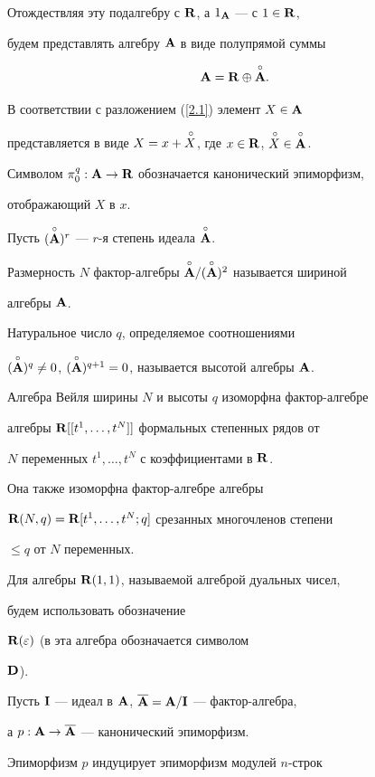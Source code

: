 Отождествляя эту подалгебру с ${\bold R}$, а $1_{\bold A}$ --- с $1\in{\bold R}$,


будем представлять алгебру ${\bold A}$ в виде полупрямой суммы


\begin{equation}


\A=\R\oplus{\Ao}.


\label{2.1}


\end{equation}


В соответствии с разложением (\ref{2.1}) элемент $X\in{\bold A}$


представляется в виде $X=x+{\overset{\,\circ}{X}{}}$, где $x\in{\bold R}$, $\overset{\,\circ}{X}{}\in\overset{\circ}{\bold A}{}$.


Символом ${\pi^q_0}:{\bold A}\to{\bold R}$ обозначается канонический эпиморфизм,


отображающий $X$ в $x$.


Пусть $(\overset{\circ}{\bold A}{})^r$ --- $r$-я степень идеала $\overset{\circ}{\bold A}{}$.


Размерность $N$ фактор-алгебры ${\overset{\circ}{\bold A}{}}/({\overset{\circ}{\bold A}{}})^2$ называется шириной


алгебры ${\bold A}$.


Натуральное число $q$, определяемое соотношениями


$(\overset{\circ}{\bold A}{})^q\ne 0$, $(\overset{\circ}{\bold A}{})^{q+1}=0$, называется высотой алгебры ${\bold A}$.


Алгебра Вейля ширины $N$ и высоты $q$ изоморфна фактор-алгебре


алгебры ${\bold R}[[t^1,\dotsc,t^N]]$ формальных степенных рядов от


$N$ переменных $t^1,\dotsc,t^N$ с коэффициентами в ${\bold R}$.


Она также изоморфна фактор-алгебре алгебры


${\bold R}(N,q)={\bold R}[t^1,\dotsc,t^N;q]$ срезанных многочленов степени


$\le q$ от $N$ переменных.


Для алгебры ${\bold R}(1,1)$, называемой алгеброй дуальных чисел,


будем использовать обозначение


${\bold R}(\varepsilon)$ (в \cite{KMS} эта алгебра обозначается символом


$\bold D$).


 


Пусть ${\bold I}$ --- идеал в ${\bold A}$, $\overline{{\bold A}}={\bold A}/{\bold I}$ --- фактор-алгебра,


а $p:{\bold A}\to\overline{{\bold A}}{}$ --- канонический эпиморфизм.


Эпиморфизм $p$ индуцирует эпиморфизм модулей $n$-строк


